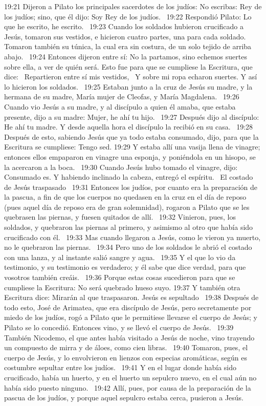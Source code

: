 19:21 Dijeron a Pilato los principales sacerdotes de los judíos: No escribas: Rey de los judíos; sino, que él dijo: Soy Rey de los judíos.  
19:22 Respondió Pilato: Lo que he escrito, he escrito.  
19:23 Cuando los soldados hubieron crucificado a Jesús, tomaron sus vestidos, e hicieron cuatro partes, una para cada soldado. Tomaron también su túnica, la cual era sin costura, de un solo tejido de arriba abajo.  
19:24 Entonces dijeron entre sí: No la partamos, sino echemos suertes sobre ella, a ver de quién será. Esto fue para que se cumpliese la Escritura, que dice:  
Repartieron entre sí mis vestidos,  
Y sobre mi ropa echaron suertes. 
Y así lo hicieron los soldados.  
19:25 Estaban junto a la cruz de Jesús su madre, y la hermana de su madre, María mujer de Cleofas, y María Magdalena.  
19:26 Cuando vio Jesús a su madre, y al discípulo a quien él amaba, que estaba presente, dijo a su madre: Mujer, he ahí tu hijo.  
19:27 Después dijo al discípulo: He ahí tu madre. Y desde aquella hora el discípulo la recibió en su casa.  
19:28 Después de esto, sabiendo Jesús que ya todo estaba consumado, dijo, para que la Escritura se cumpliese: Tengo sed. 
19:29 Y estaba allí una vasija llena de vinagre; entonces ellos empaparon en vinagre una esponja, y poniéndola en un hisopo, se la acercaron a la boca.  
19:30 Cuando Jesús hubo tomado el vinagre, dijo: Consumado es. Y habiendo inclinado la cabeza, entregó el espíritu.  
El costado de Jesús traspasado  
19:31 Entonces los judíos, por cuanto era la preparación de la pascua, a fin de que los cuerpos no quedasen en la cruz en el día de reposo (pues aquel día de reposo era de gran solemnidad), rogaron a Pilato que se les quebrasen las piernas, y fuesen quitados de allí.  
19:32 Vinieron, pues, los soldados, y quebraron las piernas al primero, y asimismo al otro que había sido crucificado con él.  
19:33 Mas cuando llegaron a Jesús, como le vieron ya muerto, no le quebraron las piernas.  
19:34 Pero uno de los soldados le abrió el costado con una lanza, y al instante salió sangre y agua.  
19:35 Y el que lo vio da testimonio, y su testimonio es verdadero; y él sabe que dice verdad, para que vosotros también creáis.  
19:36 Porque estas cosas sucedieron para que se cumpliese la Escritura: No será quebrado hueso suyo. 
19:37 Y también otra Escritura dice: Mirarán al que traspasaron. 
Jesús es sepultado   
19:38 Después de todo esto, José de Arimatea, que era discípulo de Jesús, pero secretamente por miedo de los judíos, rogó a Pilato que le permitiese llevarse el cuerpo de Jesús; y Pilato se lo concedió. Entonces vino, y se llevó el cuerpo de Jesús.  
19:39 También Nicodemo, el que antes había visitado a Jesús de noche, vino trayendo un compuesto de mirra y de áloes, como cien libras.  
19:40 Tomaron, pues, el cuerpo de Jesús, y lo envolvieron en lienzos con especias aromáticas, según es costumbre sepultar entre los judíos.  
19:41 Y en el lugar donde había sido crucificado, había un huerto, y en el huerto un sepulcro nuevo, en el cual aún no había sido puesto ninguno.  
19:42 Allí, pues, por causa de la preparación de la pascua de los judíos, y porque aquel sepulcro estaba cerca, pusieron a Jesús.  
